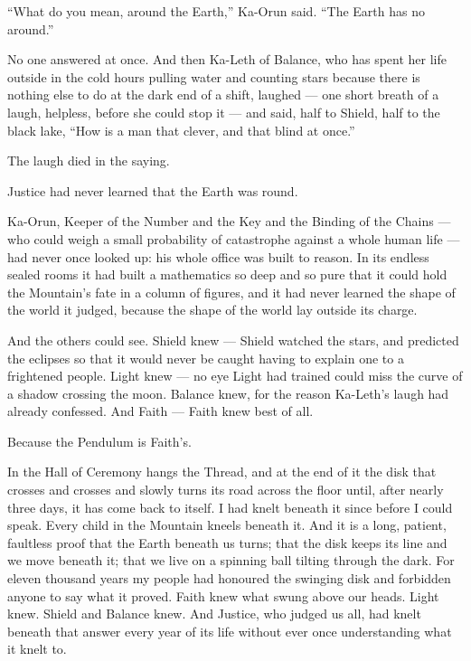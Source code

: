 ``What do you mean, around the Earth,'' Ka-Orun said. ``The Earth has no around.''\par
 
No one answered at once. And then Ka-Leth of Balance, who has spent her life outside in the cold hours pulling water and counting 
stars because there is nothing else to do at the dark end of a shift, laughed --- one short breath of a laugh, helpless, before she 
could stop it --- and said, half to Shield, half to the black lake, ``How is a man that clever, and that blind at once.''\par
 
The laugh died in the saying.\par
 
Justice had never learned that the Earth was round.\par
 
Ka-Orun, Keeper of the Number and the Key and the Binding of the Chains --- who could weigh a small probability of catastrophe against a whole human life --- had never once looked up: his whole office was built to reason. In its endless sealed rooms it had built a mathematics so deep and so pure that it could hold the Mountain's fate in a column of figures, and it had never learned the shape of the world it judged, because the shape of the world lay outside its charge.\par
 
And the others could see. Shield knew --- Shield watched the stars, and predicted the eclipses so that it would never be caught having to explain one to a frightened people. Light knew --- no eye Light had trained could miss the curve of a shadow crossing the moon. Balance knew, for the reason Ka-Leth's laugh had already confessed. And Faith --- Faith knew best of all.\par
 
Because the Pendulum is Faith's.\par
 
In the Hall of Ceremony hangs the Thread, and at the end of it the disk that crosses and crosses and slowly turns its road across the floor until, after nearly three days, it has come back to itself. I had knelt beneath it since before I could speak. Every child in the Mountain kneels beneath it. And it is a long, patient, faultless proof that the Earth beneath us turns; that the disk keeps its line and we move beneath it; that we live on a spinning ball tilting through the dark. For eleven thousand years my people had honoured the swinging disk and forbidden anyone to say what it proved. Faith knew what swung above our heads. Light knew. Shield and Balance knew. And Justice, who judged us all, had knelt beneath that answer every year of its life without ever once understanding what it knelt to.\par
 
